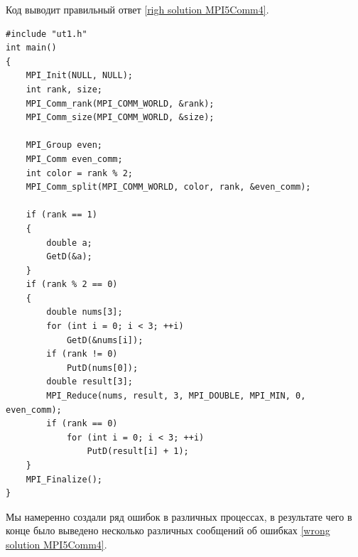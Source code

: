 Код выводит правильный ответ \ref{righ solution MPI5Comm4}.

\lstset{language=c++}
\begin{lstlisting}
#include "ut1.h"
int main()
{
	MPI_Init(NULL, NULL);
	int rank, size;
	MPI_Comm_rank(MPI_COMM_WORLD, &rank);
	MPI_Comm_size(MPI_COMM_WORLD, &size);

	MPI_Group even;
	MPI_Comm even_comm;
	int color = rank % 2;
	MPI_Comm_split(MPI_COMM_WORLD, color, rank, &even_comm);

	if (rank == 1)
	{
		double a;
		GetD(&a);
	}
	if (rank % 2 == 0)
	{
		double nums[3];
		for (int i = 0; i < 3; ++i)
			GetD(&nums[i]);
		if (rank != 0)
			PutD(nums[0]);
		double result[3];
		MPI_Reduce(nums, result, 3, MPI_DOUBLE, MPI_MIN, 0, even_comm);
		if (rank == 0)
			for (int i = 0; i < 3; ++i)
				PutD(result[i] + 1);
	}
	MPI_Finalize();
}
\end{lstlisting}

Мы намеренно создали ряд ошибок в различных процессах, в результате чего в конце было выведено несколько различных сообщений об ошибках \ref{wrong solution MPI5Comm4}.

\newpage
